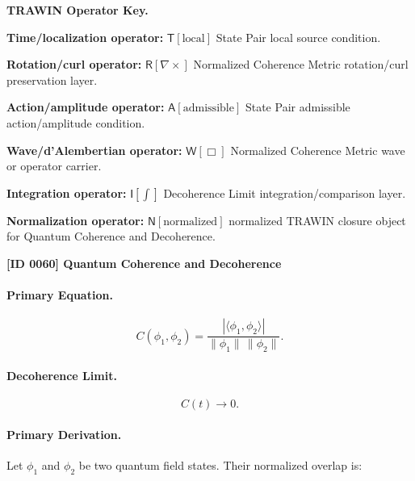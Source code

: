 \par\vspace{0.45\baselineskip}
\noindent\begin{minipage}[t]{\linewidth}
\begingroup
\small
\raggedright
\textbf{TRAWIN Operator Key.}\par
\noindent\textbf{Time/localization operator:} $\mathsf{T}\!\left[\mathrm{local}\right]$ State Pair local source condition.\par
\noindent\textbf{Rotation/curl operator:} $\mathsf{R}\!\left[\nabla\times\right]$ Normalized Coherence Metric rotation/curl preservation layer.\par
\noindent\textbf{Action/amplitude operator:} $\mathsf{A}\!\left[\mathrm{admissible}\right]$ State Pair admissible action/amplitude condition.\par
\noindent\textbf{Wave/d'Alembertian operator:} $\mathsf{W}\!\left[\Box\right]$ Normalized Coherence Metric wave or operator carrier.\par
\noindent\textbf{Integration operator:} $\mathsf{I}\!\left[\int\right]$ Decoherence Limit integration/comparison layer.\par
\noindent\textbf{Normalization operator:} $\mathsf{N}\!\left[\mathrm{normalized}\right]$ normalized TRAWIN closure object for Quantum Coherence and Decoherence.\par
\endgroup
\end{minipage}

\clearpage
\noindent\textbf{[ID 0060] Quantum Coherence and Decoherence}\par
\vspace{0.35em}
\paragraph{Primary Equation.}
\begin{equation}
C(\phi_1,\phi_2)
=
\frac{
|\langle \phi_1,\phi_2\rangle|
}{
\|\phi_1\|\,\|\phi_2\|
}.
\end{equation}

\paragraph{Decoherence Limit.}
\begin{equation}
C(t)\rightarrow 0 .
\end{equation}

\paragraph{Primary Derivation.}
Let $\phi_1$ and $\phi_2$ be two quantum field states.  
Their normalized overlap is:

